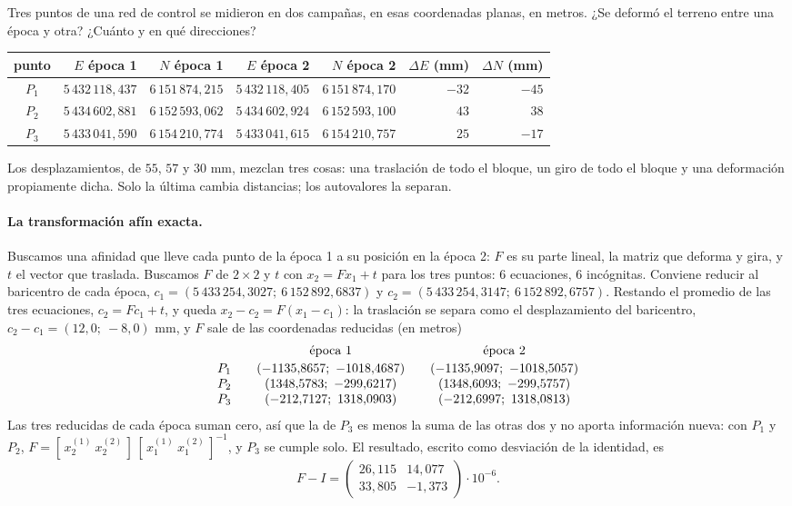 Tres puntos de una red de control se midieron en dos campañas, en esas coordenadas planas, en
metros. ¿Se deformó el terreno entre una época y otra? ¿Cuánto y en qué
direcciones?

\begin{center}
\small
\begin{tabular}{crrrrrr}
\toprule
punto & \(E\) época 1 & \(N\) época 1 & \(E\) época 2 & \(N\) época 2 & \(\Delta E\) (mm) & \(\Delta N\) (mm)\\
\midrule
\(P_1\) & \(5\,432\,118{,}437\) & \(6\,151\,874{,}215\) & \(5\,432\,118{,}405\) & \(6\,151\,874{,}170\) & \(-32\) & \(-45\)\\
\(P_2\) & \(5\,434\,602{,}881\) & \(6\,152\,593{,}062\) & \(5\,434\,602{,}924\) & \(6\,152\,593{,}100\) & \(43\) & \(38\)\\
\(P_3\) & \(5\,433\,041{,}590\) & \(6\,154\,210{,}774\) & \(5\,433\,041{,}615\) & \(6\,154\,210{,}757\) & \(25\) & \(-17\)\\
\bottomrule
\end{tabular}
\end{center}

Los desplazamientos, de \(55\), \(57\) y \(30\) mm, mezclan tres cosas: una traslación de todo
el bloque, un giro de todo el bloque y una deformación propiamente dicha. Solo la última
cambia distancias; los autovalores la separan.

\paragraph{La transformación afín exacta.} Buscamos una afinidad que lleve cada punto de la
época 1 a su posición en la época 2: \(F\) es su parte lineal, la matriz que deforma y gira, y
\(t\) el vector que traslada. Buscamos \(F\) de \(2\times2\) y \(t\) con
\(x_2=Fx_1+t\) para los tres puntos: \(6\) ecuaciones, \(6\) incógnitas. Conviene reducir al
baricentro de cada época, \(c_1=(5\,433\,254{,}3027;\ 6\,152\,892{,}6837)\) y
\(c_2=(5\,433\,254{,}3147;\ 6\,152\,892{,}6757)\). Restando el promedio de las tres
ecuaciones, \(c_2=Fc_1+t\), y queda \(x_2-c_2=F(x_1-c_1)\): la traslación se separa como el
desplazamiento del baricentro, \(c_2-c_1=(12{,}0;\ -8{,}0)\) mm, y \(F\) sale de las
coordenadas reducidas (en metros)
\[
  \begin{array}{c@{\qquad}c@{\qquad}c}
  & \text{época 1} & \text{época 2}\\[2pt]
  P_1 & (-1135{,}8657;\ -1018{,}4687) & (-1135{,}9097;\ -1018{,}5057)\\
  P_2 & (1348{,}5783;\ -299{,}6217) & (1348{,}6093;\ -299{,}5757)\\
  P_3 & (-212{,}7127;\ 1318{,}0903) & (-212{,}6997;\ 1318{,}0813)
  \end{array}
\]
Las tres reducidas de cada época suman cero, así que la de \(P_3\) es menos la suma de las
otras dos y no aporta información nueva: con \(P_1\) y \(P_2\),
\(F=[\,x_2^{(1)}\ x_2^{(2)}\,]\,[\,x_1^{(1)}\ x_1^{(2)}\,]^{-1}\), y \(P_3\) se cumple
solo. El resultado, escrito como desviación de la identidad, es
\[
  F-I=\begin{pmatrix}26{,}115&14{,}077\\33{,}805&-1{,}373\end{pmatrix}\cdot10^{-6}.
\]

